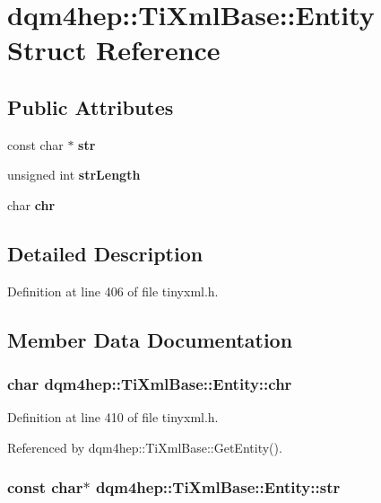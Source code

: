 \section{dqm4hep\+:\+:Ti\+Xml\+Base\+:\+:Entity Struct Reference}
\label{structdqm4hep_1_1TiXmlBase_1_1Entity}
\subsection*{Public Attributes}
\begin{DoxyCompactItemize}
\item 
const char $\ast$ {\bf str}
\item 
unsigned int {\bf str\+Length}
\item 
char {\bf chr}
\end{DoxyCompactItemize}


\subsection{Detailed Description}


Definition at line 406 of file tinyxml.\+h.



\subsection{Member Data Documentation}
\subsubsection[{chr}]{\setlength{\rightskip}{0pt plus 5cm}char dqm4hep\+::\+Ti\+Xml\+Base\+::\+Entity\+::chr}\label{structdqm4hep_1_1TiXmlBase_1_1Entity_a5d6780a278a7e39126a6932d315b1748}


Definition at line 410 of file tinyxml.\+h.



Referenced by dqm4hep\+::\+Ti\+Xml\+Base\+::\+Get\+Entity().

\subsubsection[{str}]{\setlength{\rightskip}{0pt plus 5cm}const char$\ast$ dqm4hep\+::\+Ti\+Xml\+Base\+::\+Entity\+::str}\label{structdqm4hep_1_1TiXmlBase_1_1Entity_ad4816f6cc4b3dc6dab7612a07dcc6dc3}


